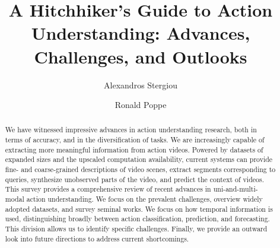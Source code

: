 \documentclass[smallextended,twocolumn,natbib]{svjour3}
\begin{document}
\title{A Hitchhiker's Guide to Action Understanding: Advances, Challenges, and Outlooks}



\author{Alexandros Stergiou \and Ronald Poppe}


\maketitle

\begin{abstract}
We have witnessed impressive advances in action understanding research, both in terms of accuracy, and in the diversification of tasks. We are increasingly capable of extracting more meaningful information from action videos. Powered by datasets of expanded sizes and the upscaled computation availability, current systems can provide fine- and coarse-grained descriptions of video scenes, extract segments corresponding to queries, synthesize unobserved parts of the video, and predict the context of videos. This survey provides a comprehensive review of recent advances in uni-and-multi-modal action understanding. We focus on the prevalent challenges, overview widely adopted datasets, and survey seminal works. We focus on how temporal information is used, distinguishing broadly between action classification, prediction, and forecasting. This division allows us to identify specific challenges. Finally, we provide an outward look into future directions to address current shortcomings.

\end{abstract}
\end{document}
